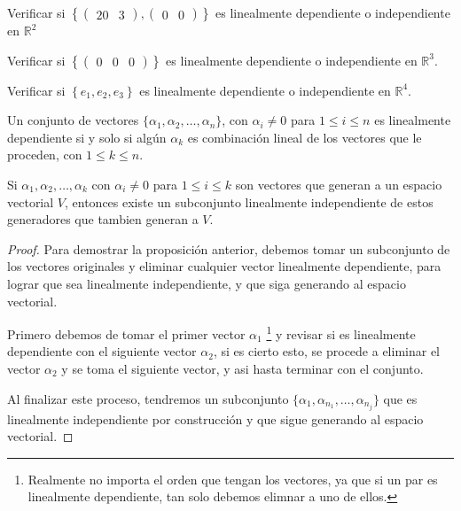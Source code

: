 		\begin{ejercicio}
			Verificar si $\left\{ \begin{pmatrix} 20 & 3 \end{pmatrix}, \begin{pmatrix} 0 & 0 \end{pmatrix} \right\}$ es linealmente dependiente o independiente en $\mathbb{R}^2$
		\end{ejercicio}

		\begin{ejercicio}
			Verificar si $\left\{ \begin{pmatrix} 0 & 0 & 0 \end{pmatrix} \right\}$ es linealmente dependiente o independiente en $\mathbb{R}^3$.
		\end{ejercicio}

		\begin{ejercicio}
			Verificar si $\left\{ e_1, e_2, e_3 \right\}$ es linealmente dependiente o independiente en $\mathbb{R}^4$.
		\end{ejercicio}

		\begin{proposicion}
			Un conjunto de vectores $\{\alpha_1, \alpha_2, \dots, \alpha_n\}$, con $\alpha_i \ne 0$ para $1 \leq i \leq n$ es linealmente dependiente si y solo si algún $\alpha_k$ es combinación lineal de los vectores que le proceden, con $1 \leq k \leq n$.
		\end{proposicion}

		\begin{proposicion}
			Si $\alpha_1, \alpha_2, \dots, \alpha_k$ con $\alpha_i \ne 0$ para $1 \leq i \leq k$ son vectores que generan a un espacio vectorial $V$, entonces existe un subconjunto linealmente independiente de estos generadores que tambien generan a $V$.
		\end{proposicion}

		\begin{proof}
			Para demostrar la proposición anterior, debemos tomar un subconjunto de los vectores originales y eliminar cualquier vector linealmente dependiente, para lograr que sea linealmente independiente, y que siga generando al espacio vectorial.

			Primero debemos de tomar el primer vector $\alpha_1$ \footnote{Realmente no importa el orden que tengan los vectores, ya que si un par es linealmente dependiente, tan solo debemos elimnar a uno de ellos.} y revisar si es linealmente dependiente con el siguiente vector $\alpha_2$, si es cierto esto, se procede a eliminar el vector $\alpha_2$ y se toma el siguiente vector, y asi hasta terminar con el conjunto.

			Al finalizar este proceso, tendremos un subconjunto $\{ \alpha_1, \alpha_{n_1}, \dots, \alpha_{n_j}\}$ que es linealmente independiente por construcción y que sigue generando al espacio vectorial.
		\end{proof}

